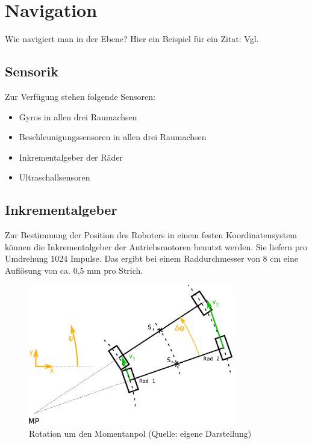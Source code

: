 \newpage
\section{Navigation}

Wie navigiert man in der Ebene? Hier ein Beispiel für ein Zitat: Vgl. \cite{bildungAtmosphaere}

\subsection{Sensorik}
Zur Verfügung stehen folgende Sensoren:
\begin{itemize}
\item Gyros in allen drei Raumachsen
\item Beschleunigungssensoren in allen drei Raumachsen
\item Inkrementalgeber der Räder
\item Ultraschallsensoren
\end{itemize}

\subsection{Inkrementalgeber}

Zur Bestimmung der Position des Roboters in einem festen Koordinatensystem können die Inkrementalgeber der Antriebsmotoren benutzt werden.
Sie liefern pro Umdrehung 1024 Impulse. Das ergibt bei einem Raddurchmesser von 8 cm eine Auflösung von ca. 0,5 mm pro Strich. 

\begin{figure}[h]  %
\centering\includegraphics[width=0.8\textwidth]{images/Kurvenkinematic.eps}
\caption{Rotation um den Momentanpol \newline (Quelle: eigene Darstellung)}
\label{kurvenkinematik}
\end{figure}

